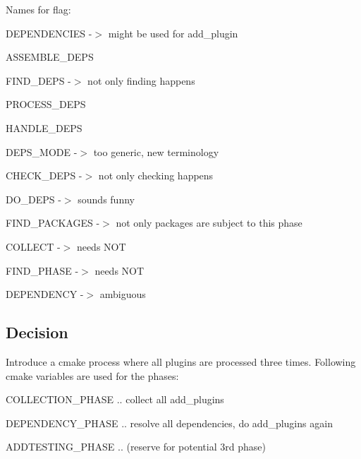 Names for flag\+:


\begin{DoxyItemize}
\item {\ttfamily D\+E\+P\+E\+N\+D\+E\+N\+C\+I\+ES} -\/$>$ might be used for {\ttfamily add\+\_\+plugin}
\item {\ttfamily A\+S\+S\+E\+M\+B\+L\+E\+\_\+\+D\+E\+PS}
\item {\ttfamily F\+I\+N\+D\+\_\+\+D\+E\+PS} -\/$>$ not only finding happens
\item {\ttfamily P\+R\+O\+C\+E\+S\+S\+\_\+\+D\+E\+PS}
\item {\ttfamily H\+A\+N\+D\+L\+E\+\_\+\+D\+E\+PS}
\item {\ttfamily D\+E\+P\+S\+\_\+\+M\+O\+DE} -\/$>$ too generic, new terminology
\item {\ttfamily C\+H\+E\+C\+K\+\_\+\+D\+E\+PS} -\/$>$ not only checking happens
\item {\ttfamily D\+O\+\_\+\+D\+E\+PS} -\/$>$ sounds funny
\item {\ttfamily F\+I\+N\+D\+\_\+\+P\+A\+C\+K\+A\+G\+ES} -\/$>$ not only packages are subject to this phase
\item {\ttfamily C\+O\+L\+L\+E\+CT} -\/$>$ needs N\+OT
\item {\ttfamily F\+I\+N\+D\+\_\+\+P\+H\+A\+SE} -\/$>$ needs N\+OT
\item {\ttfamily D\+E\+P\+E\+N\+D\+E\+N\+CY} -\/$>$ ambiguous
\end{DoxyItemize}

\subsection*{Decision}

Introduce a cmake process where all plugins are processed three times. Following cmake variables are used for the phases\+:


\begin{DoxyItemize}
\item {\ttfamily C\+O\+L\+L\+E\+C\+T\+I\+O\+N\+\_\+\+P\+H\+A\+SE} .. collect all {\ttfamily add\+\_\+plugins}
\item {\ttfamily D\+E\+P\+E\+N\+D\+E\+N\+C\+Y\+\_\+\+P\+H\+A\+SE} .. resolve all dependencies, do {\ttfamily add\+\_\+plugins} again
\item {\ttfamily A\+D\+D\+T\+E\+S\+T\+I\+N\+G\+\_\+\+P\+H\+A\+SE} .. (reserve for potential 3rd phase)
\end{DoxyItemize}

